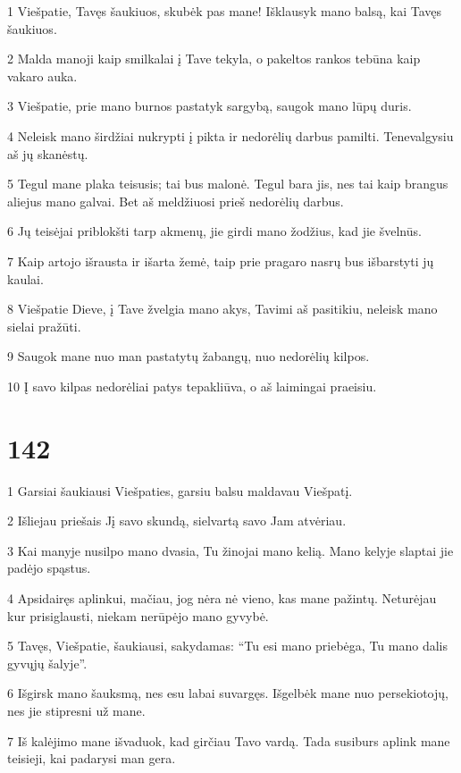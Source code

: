 \par 1 Viešpatie, Tavęs šaukiuos, skubėk pas mane! Išklausyk mano balsą, kai Tavęs šaukiuos. 
\par 2 Malda manoji kaip smilkalai į Tave tekyla, o pakeltos rankos tebūna kaip vakaro auka. 
\par 3 Viešpatie, prie mano burnos pastatyk sargybą, saugok mano lūpų duris. 
\par 4 Neleisk mano širdžiai nukrypti į pikta ir nedorėlių darbus pamilti. Tenevalgysiu aš jų skanėstų. 
\par 5 Tegul mane plaka teisusis; tai bus malonė. Tegul bara jis, nes tai kaip brangus aliejus mano galvai. Bet aš meldžiuosi prieš nedorėlių darbus. 
\par 6 Jų teisėjai priblokšti tarp akmenų, jie girdi mano žodžius, kad jie švelnūs. 
\par 7 Kaip artojo išrausta ir išarta žemė, taip prie pragaro nasrų bus išbarstyti jų kaulai. 
\par 8 Viešpatie Dieve, į Tave žvelgia mano akys, Tavimi aš pasitikiu, neleisk mano sielai pražūti. 
\par 9 Saugok mane nuo man pastatytų žabangų, nuo nedorėlių kilpos. 
\par 10 Į savo kilpas nedorėliai patys tepakliūva, o aš laimingai praeisiu.


\chapter{142}


\par 1 Garsiai šaukiausi Viešpaties, garsiu balsu maldavau Viešpatį. 
\par 2 Išliejau priešais Jį savo skundą, sielvartą savo Jam atvėriau. 
\par 3 Kai manyje nusilpo mano dvasia, Tu žinojai mano kelią. Mano kelyje slaptai jie padėjo spąstus. 
\par 4 Apsidairęs aplinkui, mačiau, jog nėra nė vieno, kas mane pažintų. Neturėjau kur prisiglausti, niekam nerūpėjo mano gyvybė. 
\par 5 Tavęs, Viešpatie, šaukiausi, sakydamas: “Tu esi mano priebėga, Tu mano dalis gyvųjų šalyje”. 
\par 6 Išgirsk mano šauksmą, nes esu labai suvargęs. Išgelbėk mane nuo persekiotojų, nes jie stipresni už mane. 
\par 7 Iš kalėjimo mane išvaduok, kad girčiau Tavo vardą. Tada susiburs aplink mane teisieji, kai padarysi man gera.


